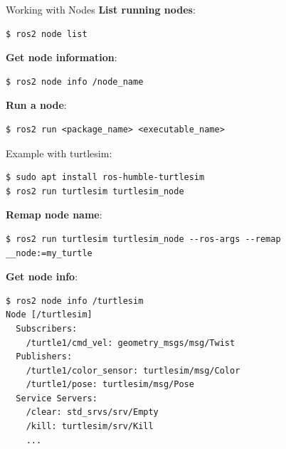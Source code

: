 \begin{frame}{Working with Nodes}
    \textbf{List running nodes}:
    \begin{lstlisting}[language=shell]
$ ros2 node list
\end{lstlisting}

    \textbf{Get node information}:
    \begin{lstlisting}[language=shell]
$ ros2 node info /node_name
\end{lstlisting}

    \textbf{Run a node}:
    \begin{lstlisting}[language=shell]
$ ros2 run <package_name> <executable_name>
\end{lstlisting}

    Example with turtlesim:
    \begin{lstlisting}[language=shell]
$ sudo apt install ros-humble-turtlesim
$ ros2 run turtlesim turtlesim_node
\end{lstlisting}

    \framebreak

    \textbf{Remap node name}:
    \begin{lstlisting}[language=shell]
$ ros2 run turtlesim turtlesim_node --ros-args --remap __node:=my_turtle
\end{lstlisting}

    \textbf{Get node info}:
    \begin{lstlisting}[language=shell]
$ ros2 node info /turtlesim
Node [/turtlesim]
  Subscribers:
    /turtle1/cmd_vel: geometry_msgs/msg/Twist
  Publishers:
    /turtle1/color_sensor: turtlesim/msg/Color
    /turtle1/pose: turtlesim/msg/Pose
  Service Servers:
    /clear: std_srvs/srv/Empty
    /kill: turtlesim/srv/Kill
    ...
\end{lstlisting}
\end{frame}

